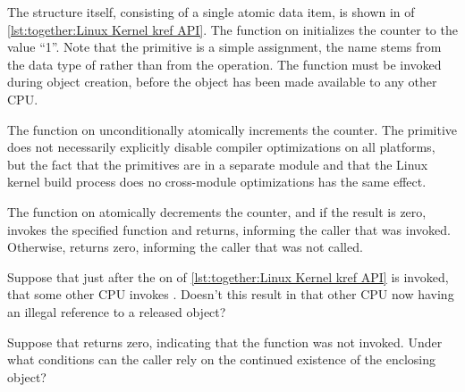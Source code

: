 \begin{lineref}
The  structure itself, consisting of a single atomic
data item, is shown in  of
\cref{lst:together:Linux Kernel kref API}.
The  function on 
initializes the counter to the value ``1''.
Note that the  primitive is a simple
assignment, the name stems from the data type of 
rather than from the operation.
The  function must be invoked during object creation,
before the object has been made available to any other CPU.

The  function on 
unconditionally atomically increments the counter.
The  primitive does not necessarily explicitly
disable compiler
optimizations on all platforms, but the fact that the 
primitives are in a separate module and that the Linux kernel build
process does no cross-module optimizations has the same effect.

The  function on 
atomically decrements the
counter, and if the result is zero,  invokes the specified
 function and  returns, informing the caller
that  was invoked.
Otherwise,  returns zero, informing the caller that
 was not called.
\end{lineref}

\QuickQuiz{}
	\begin{lineref}
	Suppose that just after the 
	on  of
	\cref{lst:together:Linux Kernel kref API} is invoked,
	that some other CPU invokes .
	Doesn't this result in that other CPU now having an illegal
	reference to a released object?
        \end{lineref}
 \QuickQuizEnd

\QuickQuiz{}
	Suppose that  returns zero, indicating that
	the  function was not invoked.
	Under what conditions can the caller rely on the continued
	existence of the enclosing object?
 \QuickQuizEnd

